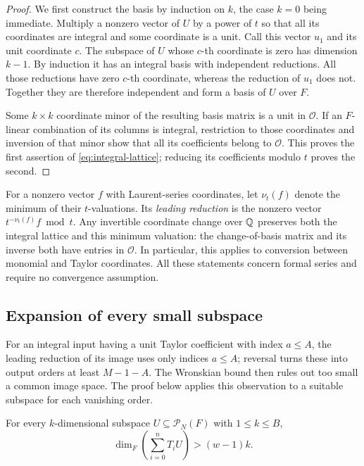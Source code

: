\begin{proof}
We first construct the basis by induction on $k$, the case $k=0$ being
immediate.  Multiply a nonzero vector of $U$ by a power of $t$ so that
all its coordinates are integral and some coordinate is a unit.  Call
this vector $u_1$ and its unit coordinate $c$.  The subspace of $U$
whose $c$-th coordinate is zero has dimension $k-1$.  By induction it
has an integral basis with independent reductions.  All those
reductions have zero $c$-th coordinate, whereas the reduction of $u_1$
does not.  Together they are therefore independent and form a basis
of $U$ over $F$.

Some $k\times k$ coordinate minor of the resulting basis matrix is a
unit in $\mathcal O$.  If an $F$-linear combination of its columns is
integral, restriction to those coordinates and inversion of that minor
show that all its coefficients belong to $\mathcal O$.  This proves
the first assertion of \eqref{eq:integral-lattice}; reducing its
coefficients modulo $t$ proves the second.
\end{proof}

For a nonzero vector $f$ with Laurent-series coordinates, let
$\nu_t(f)$ denote the minimum of their $t$-valuations.  Its
\emph{leading reduction} is the nonzero vector
$t^{-\nu_t(f)}f\bmod t$.  Any invertible coordinate change over $\mathbb Q$
preserves both the integral lattice and this minimum valuation: the
change-of-basis matrix and its inverse both have entries in $\mathcal O$.
In particular, this applies to conversion between monomial and Taylor
coordinates.  All these statements concern formal series and require
no convergence assumption.

\subsection{Expansion of every small subspace}

For an integral input having a unit Taylor coefficient with index $a\leq A$,
the leading reduction of its image uses only indices $a\leq A$; reversal
turns these into output orders at least $M-1-A$. The Wronskian bound then
rules out too small a common image space. The proof below applies this
observation to a suitable subspace for each vanishing order.

\begin{lemma}
\label{lem:small-expansion}
For every $k$-dimensional subspace $U\subseteq\mathcal P_N(F)$ with
$1\leq k\leq B$,
\begin{equation}
  \dim_F\left(\sum_{i=0}^n T_iU\right)>(w-1)k.
  \label{eq:small-expansion}
\end{equation}
\end{lemma}

